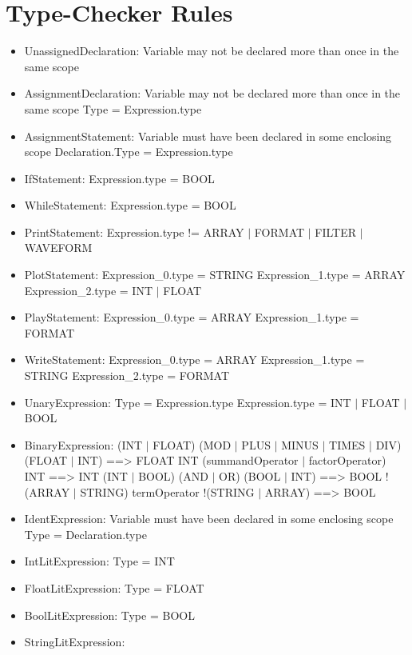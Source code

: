 \section{Type-Checker Rules}

\begin{itemize}
	\item UnassignedDeclaration:
		\subitem Variable may not be declared more than once in the same scope
	\item AssignmentDeclaration:
		\subitem Variable may not be declared more than once in the same scope
		\subitem Type = Expression.type
	\item AssignmentStatement:
		\subitem Variable must have been declared in some enclosing scope
		\subitem Declaration.Type = Expression.type
	\item IfStatement:
		\subitem Expression.type = BOOL
	\item WhileStatement:
		\subitem Expression.type = BOOL
	\item PrintStatement:
		\subitem Expression.type != ARRAY $|$ FORMAT $|$ FILTER $|$ WAVEFORM
	\item PlotStatement:
		\subitem Expression_0.type = STRING
		\subitem Expression_1.type = ARRAY
		\subitem Expression_2.type = INT $|$ FLOAT
	\item PlayStatement:
		\subitem Expression_0.type = ARRAY
		\subitem Expression_1.type = FORMAT
	\item WriteStatement:
		\subitem Expression_0.type = ARRAY
		\subitem Expression_1.type = STRING
		\subitem Expression_2.type = FORMAT
	\item UnaryExpression:
		\subitem Type = Expression.type
		\subitem Expression.type = INT $|$ FLOAT $|$ BOOL
	\item BinaryExpression:
		\subitem (INT $|$ FLOAT) (MOD $|$ PLUS $|$ MINUS $|$ TIMES $|$ DIV) (FLOAT $|$ INT) ==> FLOAT
		\subitem INT (summandOperator $|$ factorOperator) INT ==> INT
		\subitem (INT $|$ BOOL) (AND $|$ OR) (BOOL $|$ INT) ==> BOOL
		\subitem !(ARRAY $|$ STRING) termOperator !(STRING $|$ ARRAY) ==> BOOL
	\item IdentExpression:
		\subitem Variable must have been declared in some enclosing scope
		\subitem Type = Declaration.type
	\item IntLitExpression:
		\subitem Type = INT
	\item FloatLitExpression:
		\subitem Type = FLOAT
	\item BoolLitExpression:
		\subitem Type = BOOL
	\item StringLitExpression:

\end{itemize}
